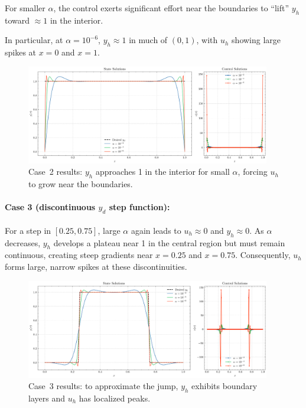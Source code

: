\documentclass[a4paper,10pt]{article}
\begin{document}
For smaller $\alpha$, the control exerts significant effort near the boundaries to \enquote{lift} $y_h$ toward $\approx1$ in the interior. 

In particular, at $\alpha=10^{-6}$, $y_h\approx1$ in much of $(0,1)$, with $u_h$ showing large spikes at $x=0$ and $x=1$.

\begin{figure}[htbp]
    \centering
    \includegraphics[width=0.95\textwidth]{figures/ocp_case2.png}
    \caption{Case~2 results: $y_h$ approaches 1 in the interior for small $\alpha$, forcing $u_h$ to grow near the boundaries.}
    \label{fig:opt_control_case2_short}
\end{figure}

\paragraph{Case 3 (discontinuous $y_d$ step function):}
For a step in $[0.25,0.75]$, large $\alpha$ again leads to $u_h\approx 0$ and $y_h\approx 0$. As $\alpha$ decreases, $y_h$ develops a plateau near 1 in the central region but must remain continuous, creating steep gradients near $x=0.25$ and $x=0.75$. Consequently, $u_h$ forms large, narrow spikes at these discontinuities.

\begin{figure}[htbp]
    \centering
    \includegraphics[width=0.95\textwidth]{figures/ocp_case3.png}
    \caption{Case~3 results: to approximate the jump, $y_h$ exhibits boundary layers and $u_h$ has localized peaks.}
    \label{fig:opt_control_case3_short}
\end{figure}
\end{document}
